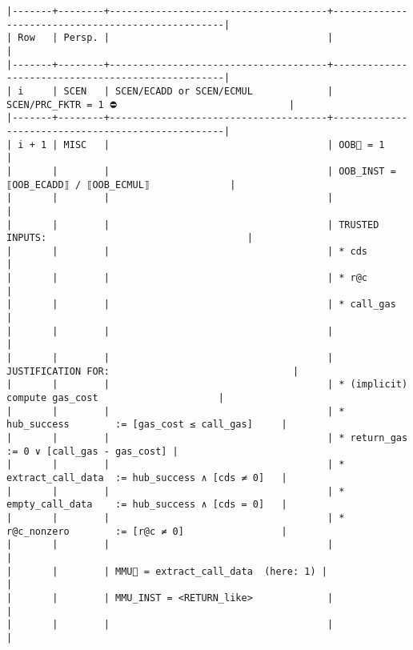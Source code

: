 \documentclass[varwidth=\maxdimen,margin=0.5cm,multi={verbatim}]{standalone}
\begin{document}
\begin{verbatim}
|-------+--------+--------------------------------------+---------------------------------------------------|
| Row   | Persp. |                                      |                                                   |
|-------+--------+--------------------------------------+---------------------------------------------------|
| i     | SCEN   | SCEN/ECADD or SCEN/ECMUL             | SCEN/PRC_FKTR = 1 ⛔                              |
|-------+--------+--------------------------------------+---------------------------------------------------|
| i + 1 | MISC   |                                      | OOB🏴 = 1                                         |
|       |        |                                      | OOB_INST = ⟦OOB_ECADD⟧ / ⟦OOB_ECMUL⟧              |
|       |        |                                      |                                                   |
|       |        |                                      | TRUSTED INPUTS:                                   |
|       |        |                                      | * cds                                             |
|       |        |                                      | * r@c                                             |
|       |        |                                      | * call_gas                                        |
|       |        |                                      |                                                   |
|       |        |                                      | JUSTIFICATION FOR:                                |
|       |        |                                      | * (implicit) compute gas_cost                     |
|       |        |                                      | * hub_success        := [gas_cost ≤ call_gas]     |
|       |        |                                      | * return_gas         := 0 ∨ [call_gas - gas_cost] |
|       |        |                                      | * extract_call_data  := hub_success ∧ [cds ≠ 0]   |
|       |        |                                      | * empty_call_data    := hub_success ∧ [cds = 0]   |
|       |        |                                      | * r@c_nonzero        := [r@c ≠ 0]                 |
|       |        |                                      |                                                   |
|       |        | MMU🏴 = extract_call_data  (here: 1) |                                                   |
|       |        | MMU_INST = <RETURN_like>             |                                                   |
|       |        |                                      |                                                   |

\end{verbatim}
\end{document}
